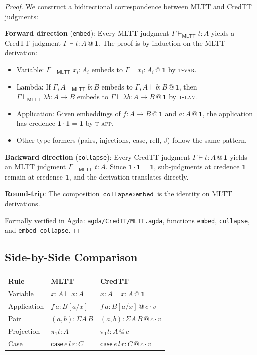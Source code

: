 \documentclass[11pt,a4paper]{article}
\makeatletter
\newcommand{\at}[1]{\,@\,#1}
\newcommand{\one}{\mathbf{1}}
\makeatother
\begin{document}
\begin{proof}
We construct a bidirectional correspondence between MLTT and CredTT judgments:

\textbf{Forward direction} (\texttt{embed}): Every MLTT judgment $\Gamma \vdash_\textsf{MLTT} t : A$ yields a CredTT judgment $\Gamma \vdash t : A \at{\one}$. The proof is by induction on the MLTT derivation:
\begin{itemize}
    \item Variable: $\Gamma \vdash_\textsf{MLTT} x_i : A_i$ embeds to $\Gamma \vdash x_i : A_i \at{\one}$ by \textsc{t-var}.
    \item Lambda: If $\Gamma, A \vdash_\textsf{MLTT} b : B$ embeds to $\Gamma, A \vdash b : B \at{\one}$, then $\Gamma \vdash_\textsf{MLTT} \lambda b : A \to B$ embeds to $\Gamma \vdash \lambda b : A \to B \at{\one}$ by \textsc{t-lam}.
    \item Application: Given embeddings of $f : A \to B \at{\one}$ and $a : A \at{\one}$, the application has credence $\one \cdot \one = \one$ by \textsc{t-app}.
    \item Other type formers (pairs, injections, case, refl, J) follow the same pattern.
\end{itemize}

\textbf{Backward direction} (\texttt{collapse}): Every CredTT judgment $\Gamma \vdash t : A \at{\one}$ yields an MLTT judgment $\Gamma \vdash_\textsf{MLTT} t : A$. Since $\one \cdot \one = \one$, sub-judgments at credence $\one$ remain at credence $\one$, and the derivation translates directly.

\textbf{Round-trip}: The composition $\texttt{collapse} \circ \texttt{embed}$ is the identity on MLTT derivations.

Formally verified in Agda: \texttt{agda/CredTT/MLTT.agda}, functions \texttt{embed}, \texttt{collapse}, and \texttt{embed-collapse}.
\end{proof}

\subsection{Side-by-Side Comparison}

\begin{center}
\begin{tabular}{l|l|l}
\textbf{Rule} & \textbf{MLTT} & \textbf{CredTT} \\
\hline
Variable & $x : A \vdash x : A$ & $x : A \vdash x : A \at{\one}$ \\
Application & $f\,a : B[a/x]$ & $f\,a : B[a/x] \at{c \cdot v}$ \\
Pair & $(a, b) : \Sigma A\,B$ & $(a, b) : \Sigma A\,B \at{c \cdot v}$ \\
Projection & $\pi_1 t : A$ & $\pi_1 t : A \at{c}$ \\
Case & $\mathsf{case}\,e\,l\,r : C$ & $\mathsf{case}\,e\,l\,r : C \at{c \cdot v}$ \\
\end{tabular}
\end{center}
\end{document}
